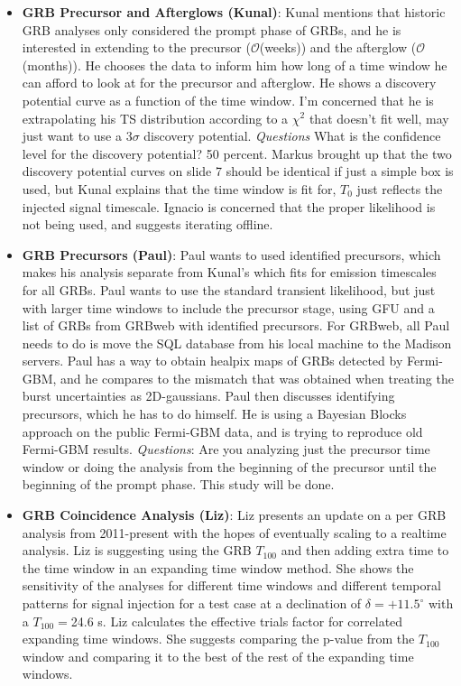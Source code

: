 \begin{itemize}
    \item \textbf{GRB Precursor and Afterglows (Kunal)}: Kunal mentions that historic GRB analyses only considered the prompt phase of GRBs, and he is interested in extending to the precursor ($\mathcal{O}$(weeks)) and the afterglow ($\mathcal{O}$(months)). He chooses the data to inform him how long of a time window he can afford to look at for the precursor and afterglow. He shows a discovery potential curve as a function of the time window. I'm concerned that he is extrapolating his TS distribution according to a $\chi ^2$ that doesn't fit well, may just want to use a 3$\sigma$ discovery potential. \emph{Questions} What is the confidence level for the discovery potential? 50 percent. Markus brought up that the two discovery potential curves on slide 7 should be identical if just a simple box is used, but Kunal explains that the time window is fit for, $T_0$ just reflects the injected signal timescale. Ignacio is concerned that the proper likelihood is not being used, and suggests iterating offline. 
    \item \textbf{GRB Precursors (Paul)}: Paul wants to used identified precursors, which makes his analysis separate from Kunal's which fits for emission timescales for all GRBs. Paul wants to use the standard transient likelihood, but just with larger time windows to include the precursor stage, using GFU and a list of GRBs from GRBweb with identified precursors. For GRBweb, all Paul needs to do is move the SQL database from his local machine to the Madison servers. Paul has a way to obtain healpix maps of GRBs detected by Fermi-GBM, and he compares to the mismatch that was obtained when treating the burst uncertainties as 2D-gaussians. Paul then discusses identifying precursors, which he has to do himself. He is using a Bayesian Blocks approach on the public Fermi-GBM data, and is trying to reproduce old Fermi-GBM results. \emph{Questions}: Are you analyzing just the precursor time window or doing the analysis from the beginning of the precursor until the beginning of the prompt phase. This study will be done.
    \item \textbf{GRB Coincidence Analysis (Liz)}: Liz presents an update on a per GRB analysis from 2011-present with the hopes of eventually scaling to a realtime analysis. Liz is suggesting using the GRB $T_{100}$ and then adding extra time to the time window in an expanding time window method. She shows the sensitivity of the analyses for different time windows and different temporal patterns for signal injection for a test case at a declination of $\delta=+11.5^{\circ}$ with a $T_{100}=$24.6 s. Liz calculates the effective trials factor for correlated expanding time windows. She suggests comparing the p-value from the $T_{100}$ window and comparing it to the best of the rest of the expanding time windows.
\end{itemize}

